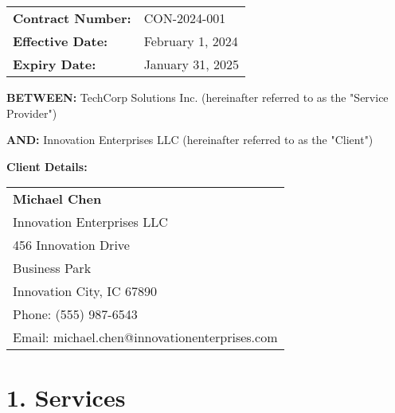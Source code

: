 \documentclass[a4paper,11pt]{article}
\begin{document}
\vspace{0.5cm}

\begin{tabular}{ll}
    \textbf{Contract Number:} & CON-2024-001 \\
    \textbf{Effective Date:} & February 1, 2024 \\
    \textbf{Expiry Date:} & January 31, 2025 \\
\end{tabular}

\vspace{0.5cm}

\textbf{BETWEEN:} TechCorp Solutions Inc. (hereinafter referred to as the "Service Provider")

\textbf{AND:} Innovation Enterprises LLC (hereinafter referred to as the "Client")

\vspace{0.5cm}

\textbf{Client Details:}

\begin{tabular}{@{}l@{}}
    
    \textbf{Michael Chen} \\
    
    
    Innovation Enterprises LLC \\
    
    
    456 Innovation Drive\\Business Park\\Innovation City, IC 67890 \\
    
    
    Phone: (555) 987-6543 \\
    
    
    Email: michael.chen@innovationenterprises.com \\
    
\end{tabular} 

\vspace{1cm}

\section{1. Services}
\end{document}
